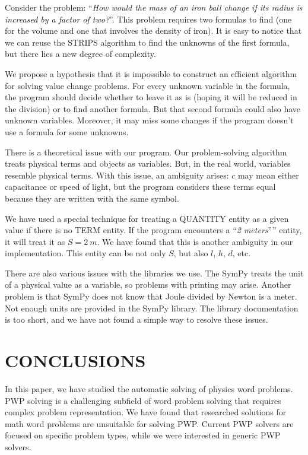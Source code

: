 \documentclass[a4paper, 12pt]{article}
\newcommand{\etext}[1]{\enquote{\textit{#1}}}
\begin{document}
	Consider the problem: \etext{How would the mass of an iron ball change
	if its radius is increased by a factor of two?}. This problem requires
	two formulas to find (one for the volume and one that involves the
	density of iron). It is easy to notice that we can reuse the STRIPS
	algorithm to find the unknowns of the first formula, but there lies a
	new degree of complexity.
	
	We propose a hypothesis that it is impossible to construct an efficient
	algorithm for solving value change problems. For every unknown variable
	in the formula, the program should decide whether to leave it as is
	(hoping it will be reduced in the division) or to find another formula.
	But that second formula could also have unknown variables. Moreover, it
	may miss some changes if the program doesn't use a formula for some
	unknowns.
	
	There is a theoretical issue with our program. Our problem-solving
	algorithm treats physical terms and objects as variables. But, in the
	real world, variables resemble physical terms. With this issue, an
	ambiguity arises: \(c\) may mean either capacitance or speed of light,
	but the program considers these terms equal because they are written
	with the same symbol.
	
	We have used a special technique for treating a QUANTITY entity as a
	given value if there is no TERM entity. If the program encounters a
	\etext{2 meters}'' entity, it will treat it as \(S = 2\ m\). We have
	found that this is another ambiguity in our implementation. This entity
	can be not only \(S\), but also \(l\), \(h\), \(d\), etc.
	
	There are also various issues with the libraries we use. The SymPy
	treats the unit of a physical value as a variable, so problems with
	printing may arise. Another problem is that SymPy does not know that
	Joule divided by Newton is a meter. Not enough units are provided in the
	SymPy library. The library documentation is too short, and we have not
	found a simple way to resolve these issues.
	
	\section{CONCLUSIONS}
	
	In this paper, we have studied the automatic solving of physics word
	problems. PWP solving is a challenging subfield of word problem solving
	that requires complex problem representation. We have found that
	researched solutions for math word problems are unsuitable for solving
	PWP. Current PWP solvers are focused on specific problem types, while we
	were interested in generic PWP solvers.
	
\end{document}
